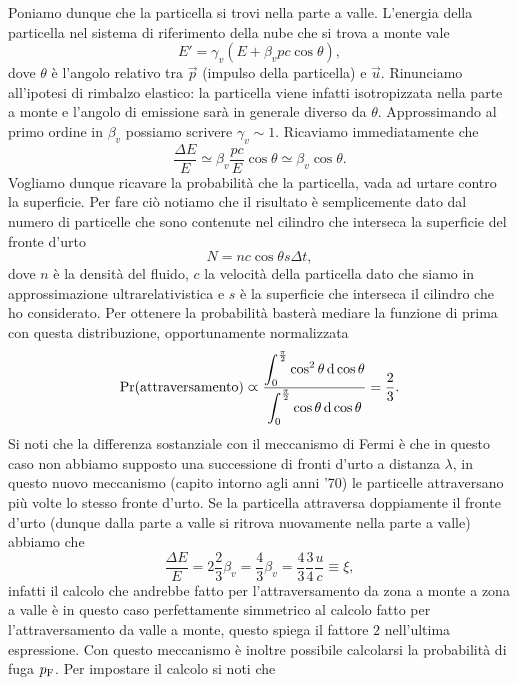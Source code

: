Poniamo dunque che la particella si trovi nella parte a valle. L'energia della particella nel sistema di riferimento della nube che si trova a monte vale
\begin{equation*}
    E' = \gamma_v(E + \beta_v pc \cos \theta),
\end{equation*}
dove $\theta$ è l'angolo relativo tra $\vec{p}$ (impulso della particella) e $\vec{u}$. Rinunciamo all'ipotesi di rimbalzo elastico: la particella viene infatti isotropizzata nella parte a monte e l'angolo di emissione sarà in generale diverso da $\theta$. Approssimando al primo ordine in $\beta_v$ possiamo scrivere $\gamma_v \sim 1$. Ricaviamo immediatamente che 
\begin{equation*}
    \frac{\Delta E}{E} \simeq \beta_v \frac{pc}{E} \cos \theta \simeq \beta_v \cos \theta.
\end{equation*}
Vogliamo dunque ricavare la probabilità che la particella, vada ad urtare contro la superficie. Per fare ciò notiamo che il risultato è semplicemente dato dal numero di particelle che sono contenute nel cilindro che interseca la superficie del fronte d'urto
\begin{equation*}
    N = n c \cos \theta s \Delta t,
\end{equation*}
dove $n$ è la densità del fluido, $c$ la velocità della particella dato che siamo in approssimazione ultrarelativistica e $s$ è la superficie che interseca il cilindro che ho considerato. Per ottenere la probabilità basterà mediare la funzione di prima con questa distribuzione, opportunamente normalizzata
\begin{equation*}
    \displaystyle\Pr(\textup{attraversamento}) \varpropto \frac{\displaystyle\int_0^{\frac{\pi}{2}}\cos^2 \theta \operatorname{d} \cos \theta}{\displaystyle\int_0^{\frac{\pi}{2}}\cos \theta \operatorname{d} \cos \theta} = \frac{2}{3}.
\end{equation*}
Si noti che la differenza sostanziale con il meccanismo di Fermi è che in questo caso non abbiamo supposto una successione di fronti d'urto a distanza $\lambda$, in questo nuovo meccanismo (capito intorno agli anni '70) le particelle attraversano più volte lo stesso fronte d'urto. Se la particella attraversa doppiamente il fronte d'urto (dunque dalla parte a valle si ritrova nuovamente nella parte a valle) abbiamo che
\begin{equation*}
    \frac{\Delta E}{E} = 2 \frac{2}{3} \beta_v = \frac{4}{3}\beta_v = \frac{4}{3}\frac{3}{4}\frac{u}{c} \equiv \xi,
\end{equation*}
infatti il calcolo che andrebbe fatto per l'attraversamento da zona a monte a zona a valle è in questo caso perfettamente simmetrico al calcolo fatto per l'attraversamento da valle a monte, questo spiega il fattore $2$ nell'ultima espressione. Con questo meccanismo è inoltre possibile calcolarsi la probabilità di fuga $p_\textup{F}$. Per impostare il calcolo si noti che 
